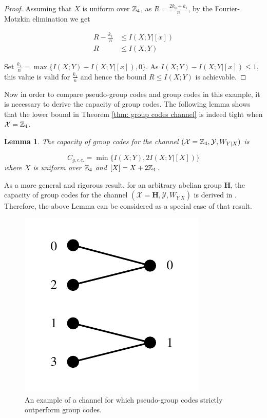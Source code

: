 \documentclass[conference]{IEEEtran}
\theoremstyle{plain}
\newtheorem{lem}{Lemma}
\theoremstyle{definition}
\theoremstyle{remark}
\begin{document}
\begin{proof}
Assuming that $X$ is uniform over $\mathbb{Z}_4$, as $R=\frac{2k_0+k_1}{n}$, by the Fourier-Motzkin elimination we get

\begin{align*}
R-\frac{k_1}{n} &\leq I(X;Y|[x])\\
R &\leq  I(X;Y)
\end{align*}

Set $\frac{k_1}{n}=\max \{I(X;Y)-I(X;Y|[x]),0\}$. As $I(X;Y)-I(X;Y|[x])\leq 1$, this value is valid for $\frac{k_1}{n}$ and hence the bound $R\leq I(X;Y)$ is achievable.
\end{proof}

Now in order to compare pseudo-group codes and group codes in this example, it is necessary to derive the capacity of group codes. The following lemma shows that the lower bound in Theorem \ref{thm: group codes channel} is indeed tight when $\mathcal{X}=\mathbb{Z}_4$.

\begin{lem}\label{lem: group_chann_z_4}
The capacity of group codes for the channel $(\mathcal{X}=\mathbb{Z}_4,\mathcal{Y}, W_{Y|X})$ is

\begin{equation}
C_{g,c.c.}=\min \{ I(X;Y),2I(X;Y|[X])\}
\end{equation} 
where $X$ is uniform over $\mathbb{Z}_4$ and $[X]=X+2\mathbb{Z}_4$.
\end{lem}
  
As a more general and rigorous result, for an arbitrary abelian group $\mathbf{H}$, the capacity of group codes for the channel $(\mathcal{X}=\mathbf{H},\mathcal{Y}, W_{Y|X})$ is derived in \cite{Aria-group}. Therefore, the above Lemma can be considered as a special case of that result. 
\begin{figure}[h!]
\centering
\includegraphics[scale=0.5]{Drawing1.pdf}
\caption{An example of a channel for which pseudo-group codes strictly outperform group codes. }
\label{fig: examp channel}
\end{figure}
\end{document}
